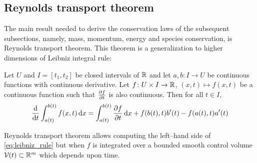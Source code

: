 
\subsection{Reynolds transport theorem}

The main result needed to derive the conservation laws of the subsequent subsections, namely, mass, momentum, energy and species conservation, is Reynolds transport theorem. This theorem is a generalization to higher dimensions of Leibniz integral rule:

\begin{theorem}
	Let  $U$ and $I = [t_1, t_2]$ be closed intervals of $\mathbb{R}$ and let $a, b \colon I \rightarrow U$ be continuous functions with continuous derivative. Let $f \colon U \times I \rightarrow \mathbb{R}$, $(x,t) \mapsto f(x,t)$ be a continuous function such that $\pdv{f}{t}$ is also continuous. Then for all $t \in I$,
	\begin{equation} \label{eq:leibniz_rule}
		\frac{\dd}{\dd{t}} \int_{a(t)}^{b(t)} f(x,t) \dd{x} = 
		\int_{a(t)}^{b(t)} \pdv{f}{t}(x,t) \dd{x} + f(b(t),t) b'(t) - f(a(t),t) a'(t)
	\end{equation}
\end{theorem}

\noindent
Reynolds transport theorem allows computing the left--hand side of \eqref{eq:leibniz_rule} but when $f$ is integrated over a bounded smooth control volume $\mathcal{V}_{}(t) \subset \mathbb{R}^m$ which depends upon time. 


